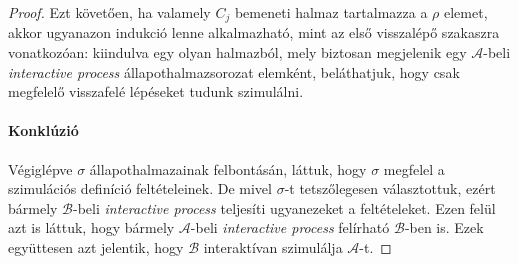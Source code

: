\documentclass[12pt]{article}
\theoremstyle{definition}
\theoremstyle{remark}
\theoremstyle{plain}
\theoremstyle{plain}
\begin{document}
\begin{proof}
        Ezt követően, ha valamely $C_{j}$ bemeneti halmaz tartalmazza a $\rho$ elemet, akkor ugyanazon indukció lenne alkalmazható, mint az első visszalépő szakaszra vonatkozóan: kiindulva egy olyan halmazból, mely biztosan megjelenik egy $\mathscr{A}$-beli \textit{interactive process} állapothalmazsorozat elemként, beláthatjuk, hogy csak megfelelő visszafelé lépéseket tudunk szimulálni.
        
        \paragraph{Konklúzió}
        Végiglépve $\sigma$ állapothalmazainak felbontásán, láttuk, hogy $\sigma$ megfelel a szimulációs definíció feltételeinek. De mivel $\sigma$-t tetszőlegesen választottuk, ezért bármely $\mathscr{B}$-beli \textit{interactive process} teljesíti ugyanezeket a feltételeket. Ezen felül azt is láttuk, hogy bármely $\mathscr{A}$-beli \textit{interactive process} felírható $\mathscr{B}$-ben is. Ezek együttesen azt jelentik, hogy $\mathscr{B}$ interaktívan szimulálja $\mathscr{A}$-t.
    \end{proof}
\end{document}
